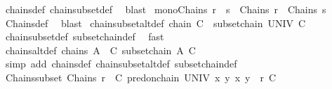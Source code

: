 \begin{isabellebody}
\ chains{\isacharunderscore}{\kern0pt}def\ chain{\isacharunderscore}{\kern0pt}subset{\isacharunderscore}{\kern0pt}def\ \isamarkupfalse%
\ blast%
\endisatagproof
{\isafoldproof}%
%
\isadelimproof
\isanewline
%
\endisadelimproof
\isanewline
{}\isamarkupfalse%
\ mono{\isacharunderscore}{\kern0pt}Chains{\isacharcolon}{\kern0pt}\ {\isachardoublequoteopen}r\ {\isasymsubseteq}\ s\ {\isasymLongrightarrow}\ Chains\ r\ {\isasymsubseteq}\ Chains\ s{\isachardoublequoteclose}\isanewline
%
\isadelimproof
\ \ %
\endisadelimproof
%
\isatagproof
{}\isamarkupfalse%
\ Chains{\isacharunderscore}{\kern0pt}def\ \isamarkupfalse%
\ blast%
\endisatagproof
{\isafoldproof}%
%
\isadelimproof
\isanewline
%
\endisadelimproof
\isanewline
{}\isamarkupfalse%
\ chain{\isacharunderscore}{\kern0pt}subset{\isacharunderscore}{\kern0pt}alt{\isacharunderscore}{\kern0pt}def{\isacharcolon}{\kern0pt}\ {\isachardoublequoteopen}chain\isactrlsub {\isasymsubseteq}\ C\ {\isacharequal}{\kern0pt}\ subset{\isachardot}{\kern0pt}chain\ UNIV\ C{\isachardoublequoteclose}\isanewline
%
\isadelimproof
\ \ %
\endisadelimproof
%
\isatagproof
{}\isamarkupfalse%
\ chain{\isacharunderscore}{\kern0pt}subset{\isacharunderscore}{\kern0pt}def\ subset{\isachardot}{\kern0pt}chain{\isacharunderscore}{\kern0pt}def\ \isamarkupfalse%
\ fast%
\endisatagproof
{\isafoldproof}%
%
\isadelimproof
\isanewline
%
\endisadelimproof
\isanewline
{}\isamarkupfalse%
\ chains{\isacharunderscore}{\kern0pt}alt{\isacharunderscore}{\kern0pt}def{\isacharcolon}{\kern0pt}\ {\isachardoublequoteopen}chains\ A\ {\isacharequal}{\kern0pt}\ {\isacharbraceleft}{\kern0pt}C{\isachardot}{\kern0pt}\ subset{\isachardot}{\kern0pt}chain\ A\ C{\isacharbraceright}{\kern0pt}{\isachardoublequoteclose}\isanewline
%
\isadelimproof
\ \ %
\endisadelimproof
%
\isatagproof
{}\isamarkupfalse%
\ {\isacharparenleft}{\kern0pt}simp\ add{\isacharcolon}{\kern0pt}\ chains{\isacharunderscore}{\kern0pt}def\ chain{\isacharunderscore}{\kern0pt}subset{\isacharunderscore}{\kern0pt}alt{\isacharunderscore}{\kern0pt}def\ subset{\isachardot}{\kern0pt}chain{\isacharunderscore}{\kern0pt}def{\isacharparenright}{\kern0pt}%
\endisatagproof
{\isafoldproof}%
%
\isadelimproof
\isanewline
%
\endisadelimproof
\isanewline
{}\isamarkupfalse%
\ Chains{\isacharunderscore}{\kern0pt}subset{\isacharcolon}{\kern0pt}\ {\isachardoublequoteopen}Chains\ r\ {\isasymsubseteq}\ {\isacharbraceleft}{\kern0pt}C{\isachardot}{\kern0pt}\ pred{\isacharunderscore}{\kern0pt}on{\isachardot}{\kern0pt}chain\ UNIV\ {\isacharparenleft}{\kern0pt}{\isasymlambda}x\ y{\isachardot}{\kern0pt}\ {\isacharparenleft}{\kern0pt}x{\isacharcomma}{\kern0pt}\ y{\isacharparenright}{\kern0pt}\ {\isasymin}\ r{\isacharparenright}{\kern0pt}\ C{\isacharbraceright}{\kern0pt}{\isachardoublequoteclose}\isanewline

\end{isabellebody}
